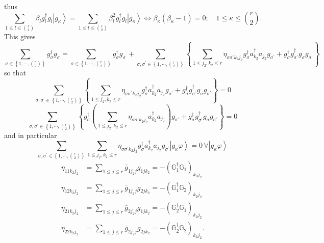 \documentclass[aps,preprint]{revtex4}%
\begin{document}
thus
\begin{equation}
\sum_{1\leq l\leq\binom{r}{2}}\beta_{l}g_{l}^{\dagger}g_{l}\left\vert
g_{\kappa}\right\rangle =\sum_{1\leq l\leq\binom{r}{2}}\beta_{l}^{2}%
g_{l}^{\dagger}g_{l}\left\vert g_{\kappa}\right\rangle \Longleftrightarrow
\beta_{\kappa}\left(  \beta_{\kappa}-1\right)  =0;\quad1\leq\kappa\leq
\binom{r}{2}.
\end{equation}
This gives
\begin{equation}
\sum_{\sigma\in\left\{  1,\cdots,\binom{r}{2}\right\}  }g_{\sigma}^{\dagger
}g_{\sigma}=\sum_{\sigma\in\left\{  1,\cdots,\binom{r}{2}\right\}  }g_{\sigma
}^{\dagger}g_{\sigma}\,+\sum_{\sigma,\sigma^{\prime}\in\left\{  1,\cdots
,\binom{r}{2}\right\}  }\left\{  \sum_{1\leq j_{2},k_{2}\leq r}\eta
_{\sigma\sigma^{\prime}k_{2}j_{2}}g_{\sigma}^{\dagger}a_{k_{2}}^{\dagger
}a_{j_{2}}g_{\sigma^{\prime}}+g_{\sigma}^{\dagger}g_{\sigma^{\prime}}%
^{\dagger}g_{\sigma}g_{\sigma^{\prime}}\right\}
\end{equation}
so that%
\begin{equation}
\sum_{\sigma,\sigma^{\prime}\in\left\{  1,\cdots,\binom{r}{2}\right\}
}\left\{  \sum_{1\leq j_{2},k_{2}\leq r}\eta_{\sigma\sigma^{\prime}k_{2}j_{2}%
}g_{\sigma}^{\dagger}a_{k_{2}}^{\dagger}a_{j_{2}}g_{\sigma^{\prime}}%
+g_{\sigma}^{\dagger}g_{\sigma^{\prime}}^{\dagger}g_{\sigma}g_{\sigma^{\prime
}}\right\}  =0
\end{equation}%
\begin{equation}
\sum_{\sigma,\sigma^{\prime}\in\left\{  1,\cdots,\binom{r}{2}\right\}
}\left\{  g_{\sigma}^{\dagger}\left(  \sum_{1\leq j_{2},k_{2}\leq r}%
\eta_{\sigma\sigma^{\prime}k_{2}j_{2}}a_{k_{2}}^{\dagger}a_{j_{2}}\right)
g_{\sigma^{\prime}}+g_{\sigma}^{\dagger}g_{\sigma^{\prime}}^{\dagger}%
g_{\sigma}g_{\sigma^{\prime}}\right\}  =0
\end{equation}
and in particular
\begin{equation}
\sum_{\sigma,\sigma^{\prime}\in\left\{  1,\cdots,\binom{r}{2}\right\}  }%
\sum_{1\leq j_{2},k_{2}\leq r}\eta_{\sigma\sigma^{\prime}k_{2}j_{2}}g_{\sigma
}^{\dagger}a_{k_{2}}^{\dagger}a_{j_{2}}g_{\sigma^{\prime}}\left\vert
g_{\kappa}\varphi\right\rangle =0\,\forall\left\vert g_{\kappa}\varphi
\right\rangle
\end{equation}%
\begin{align}
\eta_{11k_{2}j_{2}}  &  =\sum_{1\leq j\leq r}\bar{g}_{1j_{2}j}g_{1jk_{2}%
}=-\left(  \mathbb{G}_{1}^{\dagger}\mathbb{G}_{1}\right)  _{k_{2}j_{2}}\\
\eta_{12k_{2}j_{2}}  &  =\sum_{1\leq j\leq r}\bar{g}_{1j_{2}j}g_{2jk_{2}%
}=-\left(  \mathbb{G}_{1}^{\dagger}\mathbb{G}_{2}\right)  _{k_{2}j_{2}}\\
\eta_{21k_{2}j_{2}}  &  =\sum_{1\leq j\leq r}\bar{g}_{2j_{2}j}g_{1jk_{2}%
}=-\left(  \mathbb{G}_{2}^{\dagger}\mathbb{G}_{1}\right)  _{k_{2}j_{2}}\\
\eta_{22k_{2}j_{2}}  &  =\sum_{1\leq j\leq r}\bar{g}_{2j_{2}j}g_{2jk_{2}%
}=-\left(  \mathbb{G}_{2}^{\dagger}\mathbb{G}_{2}\right)  _{k_{2}j_{2}}.
\end{align}
%
\end{document}
